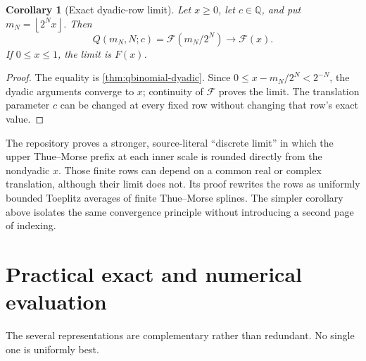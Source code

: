 \documentclass[11pt]{article}
\numberwithin{equation}{section}
\newtheorem{corollary}[theorem]{Corollary}
\theoremstyle{definition}
\theoremstyle{remark}
\newcommand{\Q}{\mathbb Q}
\newcommand{\GF}{\mathcal F}
\newcommand{\floor}[1]{\left\lfloor#1\right\rfloor}
\begin{document}
\begin{corollary}[Exact dyadic-row limit]\label{cor:dyadic-row-limit}
Let $x\ge0$, let $c\in\Q$, and put $m_N=\floor{2^Nx}$.  Then
\begin{equation}\label{eq:dyadic-row-limit}
 Q(m_N,N;c)=\GF(m_N/2^N)\longrightarrow\GF(x).
\end{equation}
If $0\le x\le1$, the limit is $F(x)$.
\end{corollary}

\begin{proof}
The equality is \cref{thm:qbinomial-dyadic}.  Since
$0\le x-m_N/2^N<2^{-N}$, the dyadic arguments converge to $x$; continuity of
$\GF$ proves the limit.  The translation parameter $c$ can be changed at
every fixed row without changing that row's exact value.
\end{proof}

The repository proves a stronger, source-literal ``discrete limit'' in which
the upper Thue--Morse prefix at each inner scale is rounded directly from the
nondyadic $x$.  Those finite rows can depend on a common real or complex
translation, although their limit does not.  Its proof rewrites the rows as
uniformly bounded Toeplitz averages of finite Thue--Morse splines.  The
simpler corollary above isolates the same convergence principle without
introducing a second page of indexing.

\section{Practical exact and numerical evaluation}\label{sec:computation}

The several representations are complementary rather than redundant.  No
single one is uniformly best.
\end{document}
